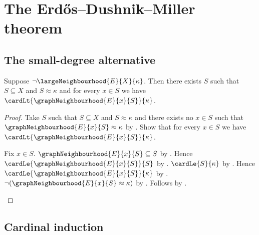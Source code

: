 \section{The Erdős--Dushnik--Miller theorem}










\subsection{The small-degree alternative}

\begin{proposition}\label{failure_of_large_neighbourhood_gives_small_degree}
    Suppose $\lnot\largeNeighbourhood{E}{X}{\kappa}$.
    Then there exists $S$ such that $S\subseteq X$ and $S\approx\kappa$ and
        for every $x\in S$ we have
            $\cardLt{\graphNeighbourhood{E}{x}{S}}{\kappa}$.
\end{proposition}
\begin{proof}
    Take $S$ such that $S\subseteq X$ and $S\approx\kappa$ and
        there exists no $x\in S$ such that
            $\graphNeighbourhood{E}{x}{S}\approx\kappa$ by
        .
    Show that for every $x\in S$ we have
        $\cardLt{\graphNeighbourhood{E}{x}{S}}{\kappa}$.
    \begin{subproof}
        Fix $x\in S$.
        $\graphNeighbourhood{E}{x}{S}\subseteq S$ by
            .
        Hence $\cardLe{\graphNeighbourhood{E}{x}{S}}{S}$ by
            .
        $\cardLe{S}{\kappa}$ by .
        Hence $\cardLe{\graphNeighbourhood{E}{x}{S}}{\kappa}$ by
            .
        $\lnot(\graphNeighbourhood{E}{x}{S}\approx\kappa)$ by
            \auto.
        Follows by .
    \end{subproof}
\end{proof}

\subsection{Cardinal induction}

